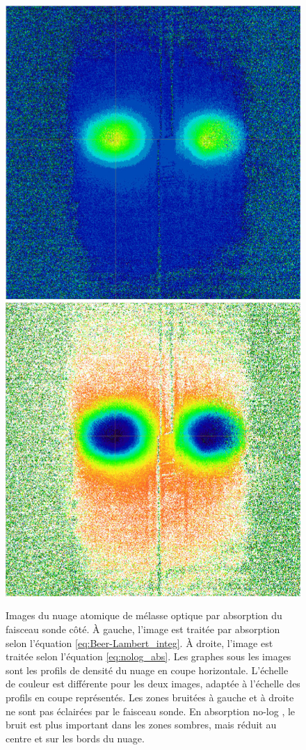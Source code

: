 \begin{figure}[h]
\centering
\includegraphics[width=0.35\linewidth]{figures/setup/coldatoms/log_abs_onlyPic}
\hspace{.15\linewidth}
\includegraphics[width=0.35\linewidth]{figures/setup/coldatoms/nolog_abs_onlyPic}
\caption[Absorption \og no-log \fg{} ]{
Images du nuage atomique de mélasse optique par absorption du faisceau sonde côté.
\`A gauche, l'image est traitée par absorption selon l'équation \eqref{eq:Beer-Lambert_integ}.
\`A droite, l'image est traitée selon l'équation \eqref{eq:nolog_abs}.
Les graphes sous les images sont les profils de densité du nuage en coupe horizontale.
L'échelle de couleur est différente pour les deux images, adaptée à l'échelle des profils en coupe représentés.
Les zones bruitées à gauche et à droite ne sont pas éclairées par le faisceau sonde. 
En absorption \og no-log \fg{}, le bruit est plus important dans les zones sombres, mais réduit au centre et sur les bords du nuage.
}
\label{fig:nolog_abs}
\end{figure}	

